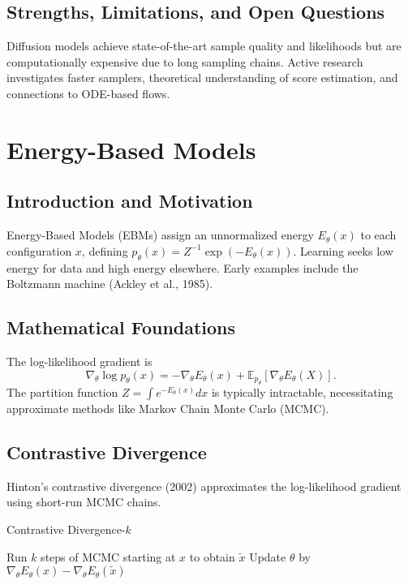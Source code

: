 \documentclass[11pt]{book}
\begin{document}
\subsection{Strengths, Limitations, and Open Questions}
Diffusion models achieve state-of-the-art sample quality and likelihoods but are computationally expensive due to long sampling chains. Active research investigates faster samplers, theoretical understanding of score estimation, and connections to ODE-based flows.

\section{Energy-Based Models}
\subsection{Introduction and Motivation}
Energy-Based Models (EBMs) assign an unnormalized energy $E_\theta(x)$ to each configuration $x$, defining $p_\theta(x)=Z^{-1}\exp(-E_\theta(x))$. Learning seeks low energy for data and high energy elsewhere. Early examples include the Boltzmann machine (Ackley et al., 1985).

\subsection{Mathematical Foundations}
The log-likelihood gradient is
\begin{equation}
\nabla_\theta \log p_\theta(x)= -\nabla_\theta E_\theta(x)+\mathbb{E}_{p_\theta}[\nabla_\theta E_\theta(X)].
\end{equation}
The partition function $Z=\int e^{-E_\theta(x)}dx$ is typically intractable, necessitating approximate methods like Markov Chain Monte Carlo (MCMC).

\subsection{Contrastive Divergence}
Hinton's contrastive divergence (2002) approximates the log-likelihood gradient using short-run MCMC chains.
\begin{algorithm}
\caption{Contrastive Divergence-$k$}
\begin{algorithmic}[1]
    \STATE Run $k$ steps of MCMC starting at $x$ to obtain $\tilde{x}$
    \STATE Update $\theta$ by $\nabla_\theta E_\theta(x)-\nabla_\theta E_\theta(\tilde{x})$
\ENDFOR
\end{algorithmic}
\end{algorithm}
\end{document}
